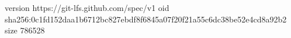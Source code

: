 version https://git-lfs.github.com/spec/v1
oid sha256:0c1fd152daa1b6712bc827ebdf8f6845a07f20f21a55c6dc38be52e4cd8a92b2
size 786528
